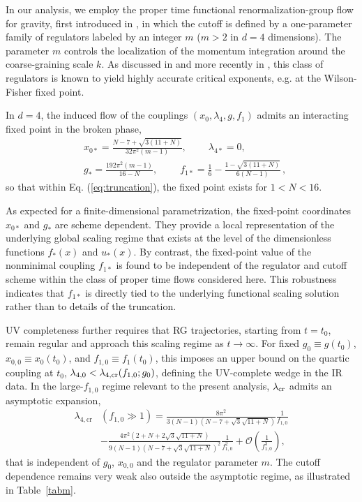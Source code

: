 \documentclass[reprint,superscriptaddress,amsmath,amssymb,aps,prl,floatfix]{revtex4-2}
\begin{document}
In our analysis, we employ the proper time functional renormalization-group flow for gravity, first introduced in \cite{Bonanno:2004sy}, in which the cutoff is defined by a one-parameter family of regulators labeled by an integer $m$ ($m>2$  in $d=4$  dimensions). The parameter $m$ controls the localization of the momentum integration around the coarse-graining scale $k$. As discussed in \cite{Bonanno:2000yp} and more recently in \cite{Bonanno:2019ukb}, this class of regulators is known to yield highly accurate critical exponents, e.g. at the Wilson-Fisher fixed point.

In $d=4$, the induced flow of the couplings $(x_0,\lambda_4,g,f_1)$ admits an interacting fixed point in the broken phase,
\begin{equation}\begin{split}
&x_{0\ast}=\frac{N-7+\sqrt{3(11+N)}}{32\pi^2(m-1)}, \qquad\ \lambda_{4\ast}=0,\\
&g_\ast=\frac{192\pi^2(m-1)}{16-N},\qquad\;
f_{1\ast}=\frac{1}{6}-\frac{1-\sqrt{3\left(11+N\right)}}{6\left(N-1\right)}\,,
\end{split}\end{equation}
so that within Eq. (\ref{eq:truncation}), the fixed point exists for $1<N<16$.

As expected for a finite-dimensional parametrization, the fixed-point coordinates $x_{0\ast}$ and $g_\ast$ are scheme dependent. They provide a local representation of the underlying global scaling regime that exists at the level of the dimensionless functions $f_\ast(x)$ and $u_\ast(x)$. By contrast, the fixed-point value of the nonminimal coupling $f_{1\ast}$ is found to be independent of the regulator and cutoff scheme within the class of proper time flows considered here. This robustness indicates that $f_{1\ast}$ is directly tied to the underlying functional scaling solution rather than to details of the truncation.

UV completeness further requires that RG trajectories, starting from $t=t_0$, remain regular and approach this scaling regime as $t\to\infty$. For fixed $g_0\equiv g(t_0)$,  $x_{0,0}\equiv x_0(t_0)$, and $f_{1,0} \equiv f_1(t_0)$, this imposes an upper bound on the quartic coupling at $t_0$, $\lambda_{4,0}<\lambda_{4,\rm cr}(f_{1,0};g_0)$, defining the UV-complete wedge in the IR data. In the large-$f_{1,0}$ regime relevant to the present analysis, $\lambda_{\rm cr}$ admits an asymptotic expansion,
\begin{equation}\begin{split}
\lambda_{4,\mathrm{cr}}
&(f_{1,0}\gg1)=\frac{8\pi^2}{3(N-1)\left(N-7+\sqrt{3}\sqrt{11+N}\right)}\frac{1}{f_{1,0}}
\\
&
-\frac{4\pi^2\left(2+N+2\sqrt{3}\sqrt{11+N}\right)}{9(N-1)\left(N-7+\sqrt{3}\sqrt{11+N}\right)^2}\frac{1}{f_{1,0}^2}
+ \mathcal{O}\!\left(\frac{1}{f_{1,0}^3}\right),
\label{eq:lambda-critical}
\end{split}\end{equation}
that is independent of $g_0$, $x_{0,0}$ and the regulator parameter $m$. The cutoff dependence remains very weak also outside the asymptotic regime, as illustrated in Table~\ref{tabm}.
\end{document}
